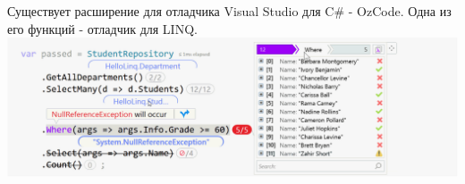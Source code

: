 \begin{frame}
\frametitle{\insertsection} 
\framesubtitle{\insertsubsection}
Существует расширение для отладчика Visual Studio для C\# - OzCode. Одна из его функций - отладчик для LINQ.
\includegraphics[scale=0.35]{img/ozcode.png}
\end{frame}
